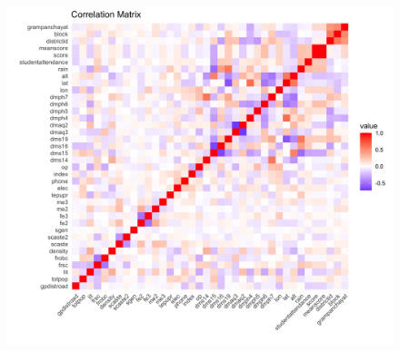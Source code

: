 \documentclass[12pt]{article}
\begin{document}

\begin{figure}[p]  %
  \centering
  \includegraphics[width=1\textwidth]{OUTPUT/MEDIA/correlation_matrix.png}  %
  \label{fig:corr}
\end{figure}



\end{document}
